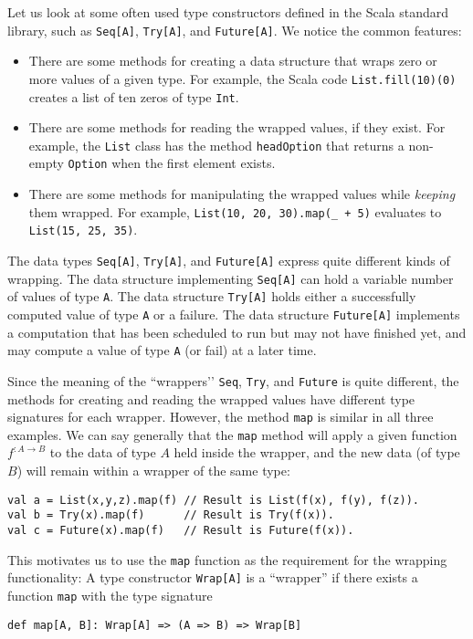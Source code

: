 Let us look at some often used type constructors defined in the Scala
standard library, such as \lstinline!Seq[A]!, \lstinline!Try[A]!,
and \lstinline!Future[A]!. We notice the common features:
\begin{itemize}
\item There are some methods for creating a data structure that wraps zero
or more values of a given type. For example, the Scala code \lstinline!List.fill(10)(0)!
creates a list of ten zeros of type \lstinline!Int!.
\item There are some methods for reading the wrapped values, if they exist.
For example, the \lstinline!List! class has the method \lstinline!headOption!
that returns a non-empty \lstinline!Option! when the first element
exists.
\item There are some methods for manipulating the wrapped values while \emph{keeping}
them wrapped. For example, \lstinline!List(10, 20, 30).map(_ + 5)!
evaluates to \lstinline!List(15, 25, 35)!.
\end{itemize}
The data types \lstinline!Seq[A]!, \lstinline!Try[A]!, and \lstinline!Future[A]!
express quite different kinds of wrapping. The data structure implementing
\lstinline!Seq[A]! can hold a variable number of values of type \lstinline!A!.
The data structure \lstinline!Try[A]! holds either a successfully
computed value of type \lstinline!A! or a failure. The data structure
\lstinline!Future[A]! implements a computation that has been scheduled
to run but may not have finished yet, and may compute a value of type
\lstinline!A! (or fail) at a later time.

Since the meaning of the \textsf{``}wrappers\textsf{'}' \lstinline!Seq!, \lstinline!Try!,
and \lstinline!Future! is quite different, the methods for creating
and reading the wrapped values have different type signatures for
each wrapper. However, the method \lstinline!map! is similar in all
three examples. We can say generally that the \lstinline!map! method
will apply a given function $f^{:A\rightarrow B}$ to the data of
type $A$ held inside the wrapper, and the new data (of type $B$)
will remain within a wrapper of the same type:
\begin{lstlisting}
val a = List(x,y,z).map(f) // Result is List(f(x), f(y), f(z)).
val b = Try(x).map(f)      // Result is Try(f(x)).
val c = Future(x).map(f)   // Result is Future(f(x)).
\end{lstlisting}
This motivates us to use the \lstinline!map! function as the requirement
for the wrapping functionality: A type constructor \lstinline!Wrap[A]!
is a \textsf{``}wrapper\textsf{''} if there exists a function \lstinline!map! with
the  type signature
\begin{lstlisting}
def map[A, B]: Wrap[A] => (A => B) => Wrap[B]
\end{lstlisting}

